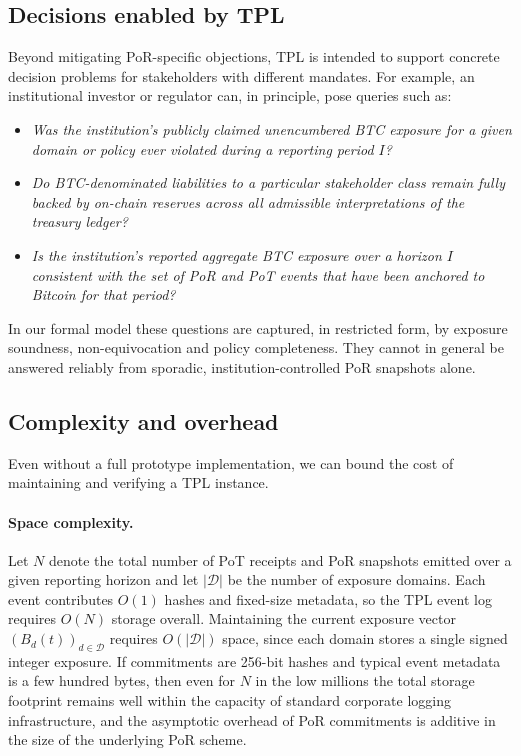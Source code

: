 \documentclass[11pt]{article}
\begin{document}
\subsection{Decisions enabled by TPL}

Beyond mitigating PoR-specific objections, TPL is intended to support concrete decision problems for stakeholders with different mandates. For example, an institutional investor or regulator can, in principle, pose queries such as:
\begin{itemize}[noitemsep]
  \item \emph{Was the institution's publicly claimed unencumbered BTC exposure for a given domain or policy ever violated during a reporting period $I$?}
  \item \emph{Do BTC-denominated liabilities to a particular stakeholder class remain fully backed by on-chain reserves across all admissible interpretations of the treasury ledger?}
  \item \emph{Is the institution's reported aggregate BTC exposure over a horizon $I$ consistent with the set of PoR and PoT events that have been anchored to Bitcoin for that period?}
\end{itemize}
In our formal model these questions are captured, in restricted form, by exposure soundness, non-equivocation and policy completeness. They cannot in general be answered reliably from sporadic, institution-controlled PoR snapshots alone.

\subsection{Complexity and overhead}
\label{sec:complexity-overhead}

Even without a full prototype implementation, we can bound the cost of maintaining and verifying a TPL instance.

\paragraph{Space complexity.}
Let $N$ denote the total number of PoT receipts and PoR snapshots emitted over a given reporting horizon and let $|\mathcal{D}|$ be the number of exposure domains.
Each event contributes $O(1)$ hashes and fixed-size metadata, so the TPL event log requires $O(N)$ storage overall.
Maintaining the current exposure vector $(B_d(t))_{d \in \mathcal{D}}$ requires $O(|\mathcal{D}|)$ space, since each domain stores a single signed integer exposure.
If commitments are 256-bit hashes and typical event metadata is a few hundred bytes, then even for $N$ in the low millions the total storage footprint remains well within the capacity of standard corporate logging infrastructure, and the asymptotic overhead of PoR commitments is additive in the size of the underlying PoR scheme.
\end{document}
